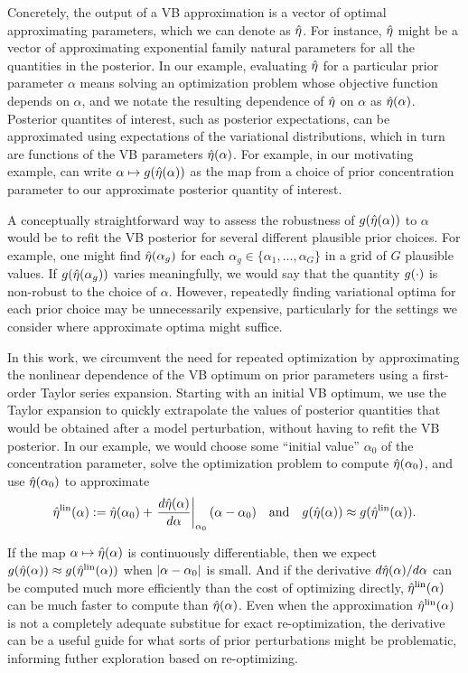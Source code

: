Concretely, the output of a VB approximation is a vector of optimal
approximating parameters, which we can denote as $\hat\eta$.  For instance,
$\hat\eta$ might be a vector of approximating exponential family natural
parameters for all the quantities in the posterior.  In our example, evaluating
$\hat\eta$ for a particular prior parameter $\alpha$ means solving an
optimization problem whose objective function depends on $\alpha$, and we notate
the resulting dependence of $\hat\eta$ on $\alpha$ as $\hat\eta(\alpha)$.
%
Posterior quantites of interest, such as posterior expectations, can be
approximated using expectations of the variational distributions, which in turn
are functions of the VB parameters $\hat\eta(\alpha)$. For example, in our
motivating example, can write $\alpha \mapsto g(\hat\eta(\alpha))$ as the map
from a choice of prior concentration parameter to our approximate posterior
quantity of interest.

A conceptually straightforward way to assess the robustness of
$g(\hat\eta(\alpha))$ to $\alpha$ would be to refit the VB posterior for several
different plausible prior choices.  For example, one might find
$\hat\eta(\alpha_g)$ for each $\alpha_g \in \{\alpha_1, \ldots, \alpha_G \}$ in a
grid of $G$ plausible values.  If $g(\hat\eta(\alpha_g))$ varies meaningfully,
we would say that the quantity $g(\cdot)$ is non-robust to the choice of
$\alpha$.  However, repeatedly finding variational optima for each prior choice
may be unnecessarily expensive, particularly for the settings we consider where
approximate optima might suffice.

In this work, we circumvent the need for repeated optimization by approximating
the nonlinear dependence of the VB optimum on prior parameters using a
first-order Taylor series expansion.  Starting with an initial VB optimum, we
use the Taylor expansion to quickly extrapolate the values of posterior
quantities that would be obtained after a model perturbation, without having to
refit the VB posterior.  In our example, we would choose some ``initial value''
$\alpha_0$ of the concentration parameter, solve the optimization problem to
compute $\hat\eta(\alpha_0)$, and use $\hat\eta(\alpha_0)$ to approximate
%
\begin{align*}
%
\etalin(\alpha) :=
    \etaopt(\alpha_0) +
    \fracat{d\etaopt(\alpha)}{d\alpha}{\alpha_0} (\alpha - \alpha_0)
\mathand
g(\etaopt(\alpha)) \approx g(\etalin(\alpha)).
%
\end{align*}

If the map $\alpha \mapsto \hat\eta(\alpha)$ is continuously differentiable, then
we expect $g(\hat\eta(\alpha)) \approx g(\hat\eta^{\mathrm{lin}}(\alpha))$ when $\left|\alpha -
\alpha_0\right|$ is small.  And if the derivative $d\hat\eta(\alpha) / d\alpha$ can be
computed much more efficiently than the cost of optimizing directly,
$\hat\eta^{\mathrm{lin}}(\alpha)$ can be much faster to compute than $\hat\eta(\alpha)$.  Even
when the approximation $\hat\eta^{\mathrm{lin}}(\alpha)$ is not a completely adequate substitue
for exact re-optimization, the derivative can be a useful guide for what sorts
of prior perturbations might be problematic, informing futher exploration based
on re-optimizing.

